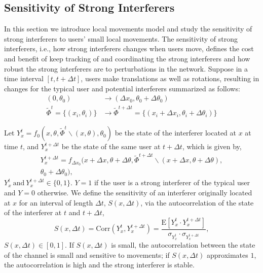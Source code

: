 \documentclass[10pt, conference, letterpaper]{IEEEtran}
\begin{document}
\subsection{Sensitivity of Strong Interferers}
In this section we introduce local movements model and study the sensitivity of strong interferers to users' small local movements.
The sensitivity of strong interferers, i.e., how strong interferers changes when users move, defines the cost and benefit of keep tracking of and coordinating the strong interferers and how robust the strong interferers are to perturbations in the network. Suppose in a time interval $[t, t+ \Delta t]$, users make translations as well as rotations, resulting in changes for the typical user and potential interferers summarized as follows:
\begin{equation*}
\begin{split}
(0,\theta_0)&\rightarrow(\Delta x_0, \theta_0 + \Delta\theta_0) \\
\tilde{\Phi}^{t}=\{(x_i, \theta_i)\}&\rightarrow\tilde{\Phi}^{t+\Delta t}=\{(x_i+\Delta x_i, \theta_i + \Delta\theta_i)\}
\end{split}
\end{equation*}

Let $Y_x^t=f_0(x, \theta, \tilde{\Phi}^t\backslash (x, \theta), \theta_0)$ be the state of the interferer located at $x$ at time $t$, and $Y_x^{t+\Delta t}$ be the state of the same user at $t+\Delta t$, which is given by,
\begin{multline*}
Y_{x}^{t+\Delta t} = f_{\Delta x_0}(x+\Delta x, \theta + \Delta\theta, \tilde{\Phi}^{t+\Delta t}\backslash (x+\Delta x, \theta + \Delta\theta), \\
\theta_0 + \Delta\theta_0),
\end{multline*}
$Y_x^t \mathrm{~and~} Y_{x}^{t+\Delta t} \in \{0,1\}$. $Y = 1$ if the user is a strong interferer of the typical user and $Y = 0$ otherwise. We define the sensitivity of an interferer originally located at $x$ for an interval of length $\Delta t$, $S(x, \Delta t)$, via the autocorrelation of the state of the interferer at $t$ and $t+\Delta t$, 
\begin{equation}
S(x, \Delta t)
=\mathrm{Corr}(Y_x^t, Y_x^{t+\Delta t})
=\frac{\mathrm{E}[Y_x^t\cdot Y_x^{t + \Delta t}]}{\sigma_{Y_x^t}\cdot \sigma_{Y_x^{t+\Delta t}}},
\end{equation}
$S(x, \Delta t)\in [0,1]$. If $S(x, \Delta t)$ is small, the autocorrelation between the state of the channel is small and sensitive to movements; if $S(x, \Delta t)$ approximates $1$, the autocorrelation is high and the strong interferer is stable.
\end{document}
